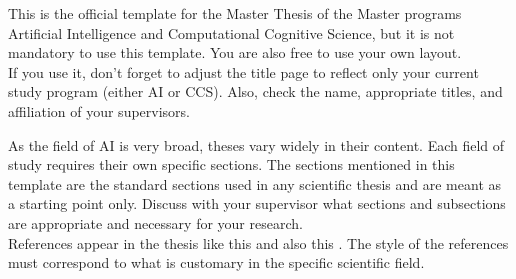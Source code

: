 \thispagestyle{acknowledgements}

This is the official template for the Master Thesis of the Master programs Artificial Intelligence and Computational Cognitive Science, but it is not mandatory to use this template. You are also free to use your own layout. \\

If you use it, don't forget to adjust the title page to reflect only your current study program (either AI or CCS). Also, check the name, appropriate titles, and affiliation of your supervisors.

As the field of AI is very broad, theses vary widely in their content. Each field of study requires their own specific sections. The sections mentioned in this template are the standard sections used in any scientific thesis and are meant as a starting point only. Discuss with your supervisor what sections and subsections are appropriate and necessary for your research. \\

References appear in the thesis like this \cite{mlp-universal} and also this \cite{rbf-universal}. The style of the references must correspond to what is customary in the specific scientific field.
